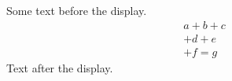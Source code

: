 \documentclass[12pt]{article}
\begin{document}
Some text before the display.
\begin{multline} a + b + c \\ + d + e \\ + f = g \end{multline}
Text after the display.
\end{document}
